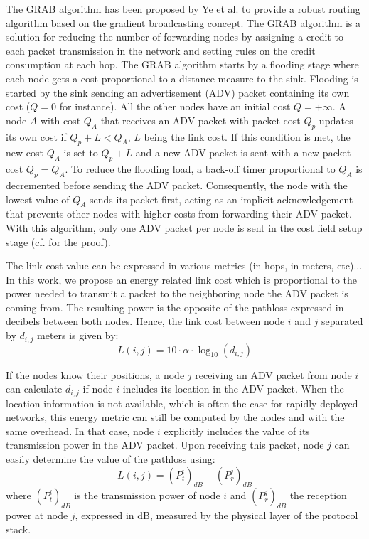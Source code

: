\documentclass[journal, peerreview, onecolumn, draftcls]{IEEEtran}
\begin{document}
The GRAB algorithm has been proposed by Ye et al. \cite{GRAB01, GRAB05} to provide a robust routing algorithm based on the gradient broadcasting concept. The GRAB algorithm is a solution for reducing the number of forwarding nodes by assigning a credit to each packet transmission in the network and setting rules on the credit consumption at each hop.
The GRAB algorithm \cite{GRAB05} starts by a flooding stage where each node gets a cost proportional to a distance measure to the sink. Flooding is started by the sink sending an advertisement (ADV) packet containing its own cost ($Q=0$ for instance). All the other nodes have an initial cost $Q=+\infty$. A node $A$ with cost $Q_A$ that receives an ADV packet with packet cost $Q_p$ updates its own cost if $Q_p + L < Q_A$, $L$ being the link cost. If this condition is met, the new cost $Q_A$ is set to $Q_p + L $ and a new ADV packet is sent with a new packet cost $Q_p = Q_A$. To reduce the flooding load, a back-off timer proportional to $Q_A$ is decremented before sending the ADV packet. Consequently, the node with the lowest value of $Q_A$ sends its packet first, acting as an implicit acknowledgement that prevents other nodes with higher costs from forwarding their ADV packet. With this algorithm, only one ADV packet per node is sent in the cost field setup stage (cf. \cite{GRAB01} for the proof).

The link cost value can be expressed in various metrics (in hops, in meters, etc)... In this work, we propose an energy related link cost which is proportional to the power needed to transmit a packet to the neighboring node the ADV packet is coming from. The resulting power is the opposite of the pathloss expressed in decibels between both nodes. Hence, the link cost between node $i$ and $j$ separated by $d_{i,j}$ meters is given by:
\begin{equation}\label{eq:linkCost}
    L(i,j) = 10\cdot \alpha \cdot \log_{10}( d_{i,j})
\end{equation}

If the nodes know their positions, a node $j$ receiving an ADV packet from node $i$ can calculate $d_{i,j}$ if node $i$ includes its location in the ADV packet.
When the location information is not available, which is often the case for rapidly deployed networks, this energy metric can still be computed by the nodes and with the same overhead. In that case, node $i$ explicitly includes the value of its transmission power in the ADV packet. Upon receiving this packet, node $j$ can easily determine the value of the pathloss using:
\begin{equation}\label{eq:linkCost2}
    L(i,j) = \left( P_t^i\right)_{dB} - \left(P_r^j\right)_{dB}
\end{equation}
\noindent where $\left( P_t^i\right)_{dB}$ is the transmission power of node $i$ and $\left(P_r^j\right)_{dB}$ the reception power at node $j$, expressed in dB, measured by the physical layer of the protocol stack.
\end{document}
